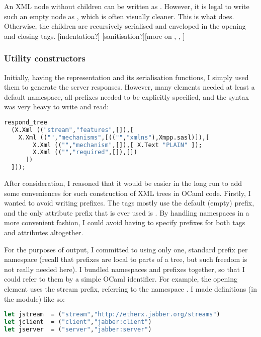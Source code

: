 \documentclass[12pt,a4paper,twoside,openright]{report}
\begin{document}
{An XML node without children can be written as . However, it is legal to write such an empty node as , which is often visually cleaner. This is what  does. Otherwise, the children are recursively serialised and enveloped in the opening and closing tags. [indentation?] [sanitisation?][more on , , ]

\subsubsection{Utility constructors}
Initially, having the  representation and its serialisation functions, I simply used them to generate the server responses. However, many elements needed at least a default namespace, all prefixes needed to be explicitly specified, and the syntax was very heavy to write and read:

\begin{lstlisting}[language=ml]
respond_tree
  (X.Xml (("stream","features",[]),[
    X.Xml (("","mechanisms",[(("","xmlns"),Xmpp.sasl)]),[
        X.Xml (("","mechanism",[]),[ X.Text "PLAIN" ]);
        X.Xml (("","required",[]),[])
      ])
  ]));
\end{lstlisting}

After consideration, I reasoned that it would be easier in the long run to add some conveniences for such construction of XML trees in OCaml code. Firstly, I wanted to avoid writing prefixes. The tags mostly use the default (empty) prefix, and the only attribute prefix that is ever used is . By handling namespaces in a more convenient fashion, I could avoid having to specify prefixes for both tags and attributes altogether.

For the purposes of output, I committed to using only one, standard prefix per namespace (recall that prefixes are local to parts of a tree, but such freedom is not really needed here). I bundled namespaces and prefixes together, so that I could refer to them by a simple OCaml identifier. For example, the opening  element uses the stream prefix, referring to the namespace . I made definitions (in the  module) like so:

\begin{lstlisting}[language=ml]
let jstream  = ("stream","http://etherx.jabber.org/streams")
let jclient  = ("client","jabber:client")
let jserver  = ("server","jabber:server")
\end{lstlisting}

}
\end{document}
